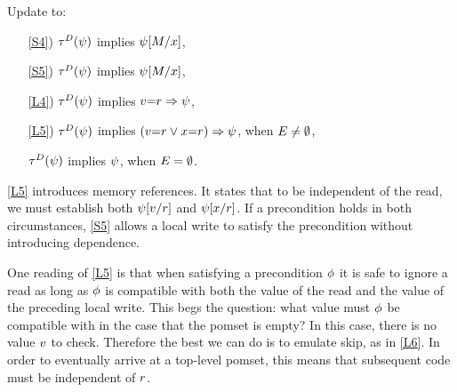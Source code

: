
\begin{definition}[\xLIR]
  \label{def:pomsets-lir}
  Update  to: %
  \begin{enumerate}
  \item[\ref{S4})]
    $\aTr{\bEvs}{\bForm}$ implies $\psi[M/x]$,
  \item[\ref{S5})]
    $\aTr{\cEvs}{\bForm}$ implies $\psi[M/x]$,
  \item[\ref{L4})]
    $\aTr{\bEvs}{\bForm}$ implies $v{=}r\Rightarrow\psi$, 
  \item[\ref{L5})]
    $\aTr{\cEvs}{\bForm}$ implies
    $(v{=}r\lor x{=}r)\Rightarrow\psi$, when $E\neq\emptyset$,
  \item[{\labeltext[L6]{L6)}{L6}}] 
    $\aTr{\dEvs}{\bForm}$ implies $\psi$, when $E=\emptyset$.
  \end{enumerate}
\end{definition}

\ref{L5} introduces memory references.  It states that to be independent of
the read, we must establish both $\psi[v/r]$ and $\psi[x/r]$.
If a precondition holds in both circumstances, \ref{S5} allows a local write
to satisfy the precondition without introducing dependence.

One reading of \ref{L5} is that when satisfying a precondition $\phi$ it is
safe to ignore a read as long as $\phi$ is compatible with both the value
of the read and the value of the preceding local write.  This begs the
question: what value must $\phi$ be compatible with in the case that the
pomset is empty?  In this case, there is no value $v$ to check.
Therefore the best we can do is to emulate skip, as in \ref{L6}.  In order to
eventually arrive at a top-level pomset, this means that subsequent code must
be independent of $r$.

